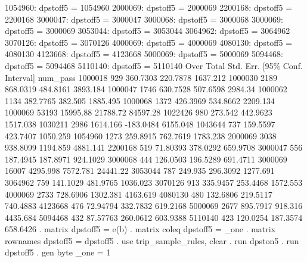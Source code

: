       1054960: dpstoff5 = 1054960
      2000069: dpstoff5 = 2000069
      2200168: dpstoff5 = 2200168
      3000047: dpstoff5 = 3000047
      3000068: dpstoff5 = 3000068
      3000069: dpstoff5 = 3000069
      3053044: dpstoff5 = 3053044
      3064962: dpstoff5 = 3064962
      3070126: dpstoff5 = 3070126
      4000069: dpstoff5 = 4000069
      4080130: dpstoff5 = 4080130
      4123668: dpstoff5 = 4123668
      5000069: dpstoff5 = 5000069
      5094468: dpstoff5 = 5094468
      5110140: dpstoff5 = 5110140
{\smallskip}
        Over {\VBAR}      Total   Std. Err.     [95\% Conf. Interval]
num_pass     {\VBAR}
     1000018 {\VBAR}        929   360.7303      220.7878    1637.212
     1000030 {\VBAR}       2189   868.0319      484.8161    3893.184
     1000047 {\VBAR}       1746   630.7528      507.6598     2984.34
     1000062 {\VBAR}       1134   382.7765       382.505    1885.495
     1000068 {\VBAR}       1372   426.3969      534.8662    2209.134
     1000069 {\VBAR}      53193   15995.88      21788.72    84597.28
     1022426 {\VBAR}        980    273.542      442.9623    1517.038
     1030211 {\VBAR}       2986   1614.166     -183.0484    6155.048
     1043644 {\VBAR}        737   159.5597      423.7407    1050.259
     1054960 {\VBAR}       1273   259.8915      762.7619    1783.238
     2000069 {\VBAR}       3038   938.8099      1194.859    4881.141
     2200168 {\VBAR}        519   71.80393      378.0292    659.9708
     3000047 {\VBAR}        556   187.4945      187.8971    924.1029
     3000068 {\VBAR}        444   126.0503      196.5289    691.4711
     3000069 {\VBAR}      16007   4295.998      7572.781    24441.22
     3053044 {\VBAR}        787    249.935      296.3092    1277.691
     3064962 {\VBAR}        759   141.1029      481.9765    1036.023
     3070126 {\VBAR}        913   335.9457      253.4468    1572.553
     4000069 {\VBAR}       2733   728.6906      1302.381    4163.619
     4080130 {\VBAR}        480   132.6806      219.5117    740.4883
     4123668 {\VBAR}        476   72.94794      332.7832    619.2168
     5000069 {\VBAR}       2677   895.7917       918.316    4435.684
     5094468 {\VBAR}        432   87.57763      260.0612    603.9388
     5110140 {\VBAR}        423   120.0254      187.3574    658.6426
{\smallskip}
. matrix dpstoff5 = e(b)
{\smallskip}
. matrix coleq dpstoff5 = _one
{\smallskip}
. matrix rownames dpstoff5 = dpstoff5
{\smallskip}
. use trip_sample_rules, clear
{\smallskip}
. run dpston5
{\smallskip}
. run dpstoff5
{\smallskip}
. gen byte _one = 1       
